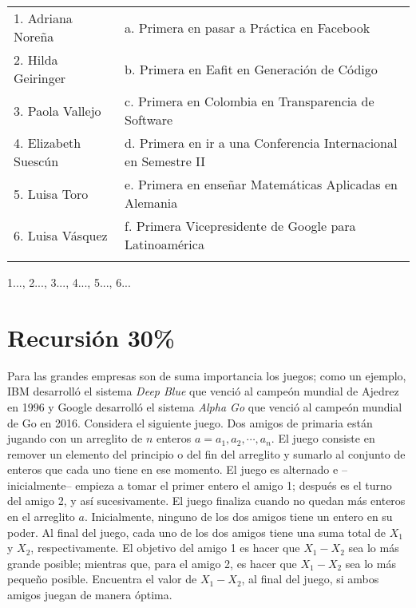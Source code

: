 \documentclass[10 pt]{article}
\begin{document}
\begin{tabular}{l l}
1. Adriana Noreña &  a. Primera en pasar a Práctica en Facebook \\
2. Hilda Geiringer &  b. Primera en Eafit en Generación de Código \\
3. Paola Vallejo &  c. Primera en Colombia en Transparencia de Software  \\
4. Elizabeth Suescún &  d. Primera en ir a una Conferencia Internacional en Semestre II \\
5. Luisa Toro &  e. Primera en enseñar Matemáticas Aplicadas en Alemania \\
6. Luisa Vásquez &  f. Primera Vicepresidente de Google para Latinoamérica \\
\\
 \end{tabular}
 




1..., 2..., 3..., 4..., 5..., 6...


\newpage

\section{Recursión 30\%}

 Para las grandes empresas son de suma importancia los juegos; como un ejemplo, IBM desarrolló el sistema  \textit{Deep  Blue} que venció al campeón mundial de Ajedrez en 1996 y  Google desarrolló el sistema \emph{Alpha Go} que venció al campeón mundial de Go en 2016. Considera el siguiente juego. Dos amigos de primaria están jugando con un arreglito de $n$ enteros $a = {a_1, a_2, \cdots, a_n}$. El juego consiste en remover un elemento del principio o del fin del arreglito y sumarlo al conjunto de enteros que cada uno tiene en ese momento. El juego es alternado e --inicialmente-- empieza a tomar el primer entero el amigo 1; después es el turno del amigo 2, y así sucesivamente. El juego finaliza cuando no quedan más enteros en el arreglito $a$. Inicialmente, ninguno de los dos amigos tiene un entero en su poder. Al final del juego, cada uno de los dos amigos tiene una suma total de $X_1$ y $X_2$, respectivamente. El objetivo del amigo 1 es hacer que $X_1 - X_2$ sea lo más grande posible; mientras que, para el amigo 2, es hacer que $X_1 - X_2$ sea lo más pequeño posible. Encuentra el valor de $X_1 - X_2$, al final del juego, si ambos amigos juegan de manera óptima. 
\end{document}
